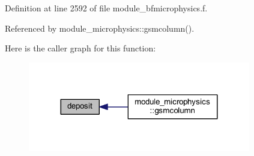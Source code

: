Definition at line 2592 of file module\+\_\+bfmicrophysics.\+f.



Referenced by module\+\_\+microphysics\+::gsmcolumn().



Here is the caller graph for this function\+:
\nopagebreak
\begin{figure}[H]
\begin{center}
\leavevmode
\includegraphics[width=275pt]{module__bfmicrophysics_8f_a3c00353fd3ab0fba51a524a05a5fc640_icgraph}
\end{center}
\end{figure}



